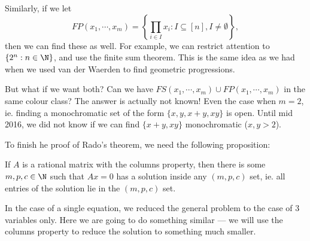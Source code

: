 \documentclass[a4paper]{article}
\begin{document}
Similarly, if we let
\[
  FP(x_1, \cdots, x_m) = \left\{\prod_{i \in I} x_i : I \subseteq [n], I \not= \emptyset\right\},
\]
then we can find these as well. For example, we can restrict attention to $\{2^n: n \in \N\}$, and use the finite sum theorem. This is the same idea as we had when we used van der Waerden to find geometric progressions.

But what if we want both? Can we have $FS(x_1,\cdots, x_m) \cup FP(x_1, \cdots, x_m)$ in the same colour class? The answer is actually not known! Even the case when $m = 2$, ie. finding a monochromatic set of the form $\{x, y, x + y, xy\}$ is open. Until mid 2016, we did not know if we can find $\{x + y, xy\}$ monochromatic ($x, y > 2$).

To finish he proof of Rado's theorem, we need the following proposition:
\begin{prop}
  If $A$ is a rational matrix with the columns property, then there is some $m, p, c \in \N$ such that $Ax = 0$ has a solution inside any $(m, p, c)$ set, ie. all entries of the solution lie in the $(m, p, c)$ set.
\end{prop}
In the case of a single equation, we reduced the general problem to the case of 3 variables only. Here we are going to do something similar --- we will use the columns property to reduce the solution to something much smaller.
\end{document}
